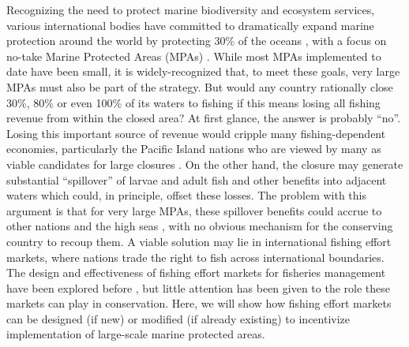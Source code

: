 \documentclass[12pt]{article}
\begin{document}
Recognizing the need to protect marine biodiversity and ecosystem services, various international bodies have committed to dramatically expand marine protection around the world by protecting 30\% of the oceans \cite{oleary_2016,dinerstein_2019}, with a focus on no-take Marine Protected Areas (MPAs) \cite{sala_2017,sala_2018}. While most MPAs implemented to date have been small, it is widely-recognized that, to meet these goals, very large MPAs must also be part of the strategy. But would any country rationally close 30\%, 80\% or even 100\% of its waters to fishing if this means losing all fishing revenue from within the closed area? At first glance, the answer is probably ``no''. Losing this important source of revenue would cripple many fishing-dependent economies, particularly the Pacific Island nations who are viewed by many as viable candidates for large closures \cite{mcleod_2019}. On the other hand, the closure may generate substantial ``spillover'' of larvae and adult fish \cite{ramesh_2019,hernndez_2019} and other benefits into adjacent waters which could, in principle, offset these losses. The problem with this argument is that for very large MPAs, these spillover benefits could accrue to other nations and the high seas \cite{agardy_2018}, with no obvious mechanism for the conserving country to recoup them. A viable solution may lie in international fishing effort markets, where nations trade the right to fish across international boundaries. The design and effectiveness of fishing effort markets for fisheries management have been explored before \cite{havice_2010,havice_2013}, but little attention has been given to the role these markets can play in conservation. Here, we will show how fishing effort markets can be designed (if new) or modified (if already existing) to incentivize implementation of large-scale marine protected areas.
\end{document}
